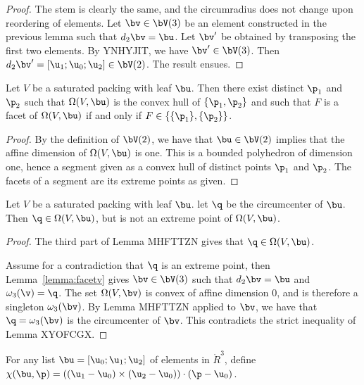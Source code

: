 \begin{proof} The stem is clearly the same, and the circumradius does not change upon reordering of
elements.  Let $\bv\in \bV(3)$ be an element constructed in the previous lemma such that
$d_2\bv=\bu$.  Let $\bv'$ be obtained by transposing the first two elements.  By YNHYJIT,
we have $\bv'\in \bV(3)$.    Then $d_2\bv' = [\u_1;\u_0;\u_2]\in \bV(2)$.  The result ensues.
\end{proof}


\begin{lemma}\label{lemma:p1p2} 
Let $V$ be a saturated packing with leaf $\bu$.  Then there exist distinct $\p_1$ and $\p_2$ such
that $\Omega(V,\bu)$ is the convex hull of $\{\p_1,\p_2\}$ and such that
$F$ is a facet of $\Omega(V,\bu)$ if and only if $F\in \{\{\p_1\},\{\p_2\}\}$.
\end{lemma}

\begin{proof}  By the definition of $\bV(2)$,  we have that $\bu\in \bV(2)$ implies that
the affine dimension of $\Omega(V,\bu)$ is one.  This is a bounded polyhedron of dimension one,
hence a segment given as a convex hull of distinct points $\p_1$ and $\p_2$.  The facets of a segment
are its extreme points as given.
\end{proof}

\begin{lemma}  Let $V$ be a saturated packing with leaf $\bu$.  let $\q$ be the circumcenter of $\bu$.
Then $\q\in\Omega(V,\bu)$, but is not an extreme point of $\Omega(V,\bu)$.
\end{lemma}

\begin{proof} The third part of Lemma MHFTTZN gives that $\q\in \Omega(V,\bu)$. 

Assume for a contradiction that
$\q$ is an extreme point, then Lemma~\ref{lemma:facetv} gives $\bv\in \bV(3)$ such that
$d_2\bv = \bu$ and $\omega_3(\v)=\q$.  The set $\Omega(V,\bv)$ is convex of affine dimension $0$,
and is therefore a singleton $\omega_3(\bv)$.   By Lemma MHFTTZN applied to $\bv$, we have that
$\q=\omega_3(\bv)$ is the circumcenter of $\bv$.  This contradicts the strict inequality of Lemma XYOFCGX.
\end{proof}

\begin{definition}[$\chi$] For any list $\bu = [\u_0;\u_1;\u_2]$ of  elements in $\ring{R}^3$, define 
$\chi(\bu,\p) = ((\u_1-\u_0)\times (\u_2-\u_0))\cdot(\p-\u_0)$.
\end{definition}




